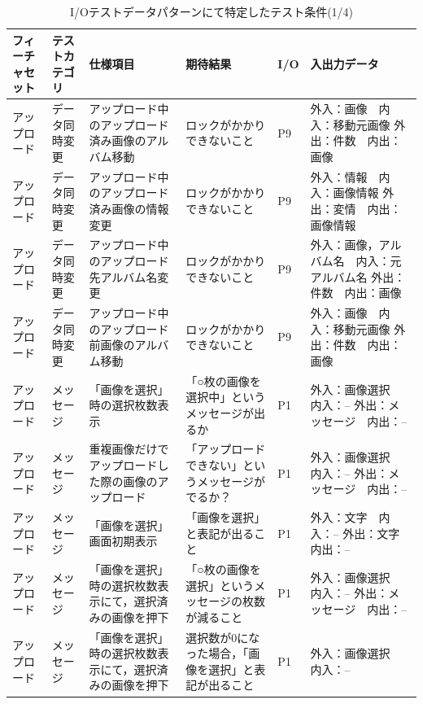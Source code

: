 \begin{table}[htbp]
  \scriptsize
  \centering
  \caption{I/Oテストデータパターンにて特定したテスト条件(1/4)}
    \begin{tabular}{|p{8em}|p{7em}|p{9em}|p{9em}|p{3em}|p{12em}|}
\cline{1-6}   フィーチャセット & テストカテゴリ  & 仕様項目 & 期待結果  & I/O   & 入出力データ \bigstrut\\
    \hline
    \hline
    アップロード & データ同時変更 & アップロード中のアップロード済み画像のアルバム移動 & ロックがかかりできないこと & P9    & 外入：画像　内入：移動元画像
外出：件数　内出：画像 \bigstrut\\
    \hline
    アップロード & データ同時変更 & アップロード中のアップロード済み画像の情報変更 & ロックがかかりできないこと & P9    & 外入：情報　内入：画像情報
外出：変情　内出：画像情報 \bigstrut\\
    \hline
    アップロード & データ同時変更 & アップロード中のアップロード先アルバム名変更 & ロックがかかりできないこと & P9    & 外入：画像，アルバム名　内入：元アルバム名
外出：件数　内出：画像 \bigstrut\\
    \hline
    アップロード & データ同時変更 & アップロード中のアップロード前画像のアルバム移動 & ロックがかかりできないこと & P9    & 外入：画像　内入：移動元画像
外出：件数　内出：画像 \bigstrut\\
    \hline
    アップロード & メッセージ & 「画像を選択」時の選択枚数表示 & 「○枚の画像を選択中」というメッセージが出るか & P1    & 外入：画像選択　内入：--
外出：メッセージ　内出：-- \bigstrut\\
    \hline
    アップロード & メッセージ & 重複画像だけでアップロードした際の画像のアップロード & 「アップロードできない」というメッセージがでるか？ & P1    & 外入：画像選択　内入：--
外出：メッセージ　内出：-- \bigstrut\\
    \hline
    アップロード & メッセージ & 「画像を選択」画面初期表示 & 「画像を選択」と表記が出ること & P1    & 外入：文字　内入：--
外出：文字　内出：-- \bigstrut\\
    \hline
    アップロード & メッセージ & 「画像を選択」時の選択枚数表示にて，選択済みの画像を押下 & 「○枚の画像を選択」というメッセージの枚数が減ること & P1    & 外入：画像選択　内入：--
外出：メッセージ　内出：-- \bigstrut\\
    \hline
    アップロード & メッセージ & 「画像を選択」時の選択枚数表示にて，選択済みの画像を押下 & 選択数が0になった場合，「画像を選択」と表記が出ること & P1    & 外入：画像選択　内入：--

\end{tabular}
\end{table}
